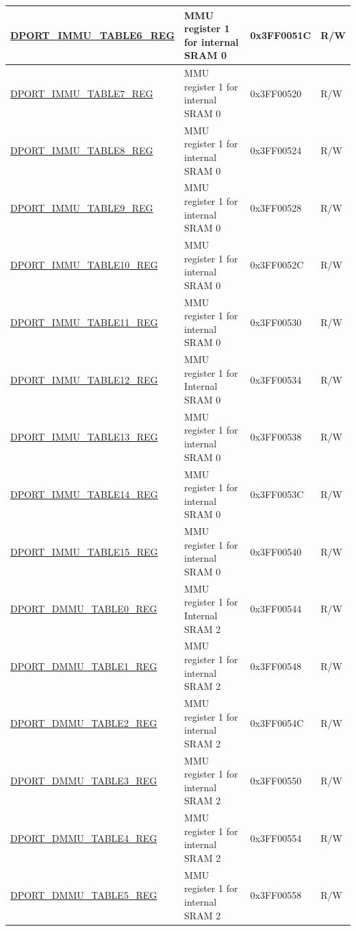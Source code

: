\begin{longtable}{ |L{8.2cm} | L{4.5cm} | l | l | }
\hyperref[regdesc:IMMUTABLEnREG]{DPORT\_IMMU\_TABLE6\_REG} & MMU register 1 for internal SRAM 0 & 0x3FF0051C & R/W \\ \hline
\hyperref[regdesc:IMMUTABLEnREG]{DPORT\_IMMU\_TABLE7\_REG} & MMU register 1 for internal SRAM 0 & 0x3FF00520 & R/W \\ \hline
\hyperref[regdesc:IMMUTABLEnREG]{DPORT\_IMMU\_TABLE8\_REG} & MMU register 1 for internal SRAM 0 & 0x3FF00524 & R/W \\ \hline
\hyperref[regdesc:IMMUTABLEnREG]{DPORT\_IMMU\_TABLE9\_REG} & MMU register 1 for internal SRAM 0 & 0x3FF00528 & R/W \\ \hline
\hyperref[regdesc:IMMUTABLEnREG]{DPORT\_IMMU\_TABLE10\_REG} & MMU register 1 for internal SRAM 0 & 0x3FF0052C & R/W \\ \hline
\hyperref[regdesc:IMMUTABLEnREG]{DPORT\_IMMU\_TABLE11\_REG} & MMU register 1 for internal SRAM 0 & 0x3FF00530 & R/W \\ \hline
\hyperref[regdesc:IMMUTABLEnREG]{DPORT\_IMMU\_TABLE12\_REG} & MMU register 1 for Internal SRAM 0 & 0x3FF00534 & R/W \\ \hline
\hyperref[regdesc:IMMUTABLEnREG]{DPORT\_IMMU\_TABLE13\_REG} & MMU register 1 for internal SRAM 0 & 0x3FF00538 & R/W \\ \hline
\hyperref[regdesc:IMMUTABLEnREG]{DPORT\_IMMU\_TABLE14\_REG} & MMU register 1 for internal SRAM 0 & 0x3FF0053C & R/W \\ \hline
\hyperref[regdesc:IMMUTABLEnREG]{DPORT\_IMMU\_TABLE15\_REG} & MMU register 1 for internal SRAM 0 & 0x3FF00540 & R/W \\ \hline
\hyperref[regdesc:DMMUTABLEnREG]{DPORT\_DMMU\_TABLE0\_REG} & MMU register 1 for Internal SRAM 2 & 0x3FF00544 & R/W \\ \hline
\hyperref[regdesc:DMMUTABLEnREG]{DPORT\_DMMU\_TABLE1\_REG} & MMU register 1 for internal SRAM 2 & 0x3FF00548 & R/W \\ \hline
\hyperref[regdesc:DMMUTABLEnREG]{DPORT\_DMMU\_TABLE2\_REG} & MMU register 1 for internal SRAM 2 & 0x3FF0054C & R/W \\ \hline
\hyperref[regdesc:DMMUTABLEnREG]{DPORT\_DMMU\_TABLE3\_REG} & MMU register 1 for internal SRAM 2 & 0x3FF00550 & R/W \\ \hline
\hyperref[regdesc:DMMUTABLEnREG]{DPORT\_DMMU\_TABLE4\_REG} & MMU register 1 for internal SRAM 2 & 0x3FF00554 & R/W \\ \hline
\hyperref[regdesc:DMMUTABLEnREG]{DPORT\_DMMU\_TABLE5\_REG} & MMU register 1 for internal SRAM 2 & 0x3FF00558 & R/W \\ \hline

\end{longtable}
